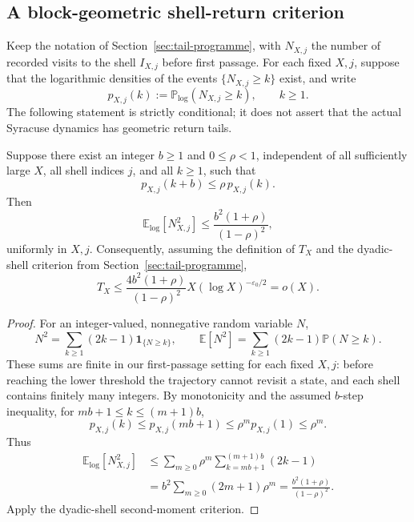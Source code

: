 \subsection*{A block-geometric shell-return criterion}

Keep the notation of Section~\ref{sec:tail-programme}, with
$N_{X,j}$ the number of recorded visits to the shell $I_{X,j}$
before first passage. For each fixed $X,j$, suppose that the
logarithmic densities of the events $\{N_{X,j}\ge k\}$ exist, and
write
\[
 p_{X,j}(k):=\mathbb P_{\log}(N_{X,j}\ge k),\qquad k\ge1.
\]
The following statement is strictly conditional; it does not assert
that the actual Syracuse dynamics has geometric return tails.

\begin{proposition}
\label{prop:block-geometric-shell-return}
Suppose there exist an integer $b\ge1$ and $0\le\rho<1$,
independent of all sufficiently large $X$, all shell indices $j$,
and all $k\ge1$, such that
\begin{equation}\label{eq:block-geometric-shell-assumption}
 p_{X,j}(k+b)\le\rho\,p_{X,j}(k).
\end{equation}
Then
\[
 \mathbb E_{\log}[N_{X,j}^{2}]
 \le \frac{b^{2}(1+\rho)}{(1-\rho)^{2}},
\]
uniformly in $X,j$. Consequently, assuming the definition of $T_X$
and the dyadic-shell criterion from Section~\ref{sec:tail-programme},
\[
 T_X \le
 \frac{4b^{2}(1+\rho)}{(1-\rho)^{2}}
 X(\log X)^{-\varepsilon_0/2}
 =o(X).
\]
\end{proposition}
\begin{proof}
For an integer-valued, nonnegative random variable $N$,
\[
 N^{2}=\sum_{k\ge1}(2k-1)\mathbf 1_{\{N\ge k\}},
\qquad
\mathbb E[N^{2}]=\sum_{k\ge1}(2k-1)\mathbb P(N\ge k).
\]
These sums are finite in our first-passage setting for each fixed
$X,j$: before reaching the lower threshold the trajectory cannot
revisit a state, and each shell contains finitely many integers.
By monotonicity and the assumed $b$-step inequality, for
$mb+1\le k\le(m+1)b$,
\[
 p_{X,j}(k)\le p_{X,j}(mb+1)
 \le \rho^{m}p_{X,j}(1)\le\rho^{m}.
\]
Thus
\[
 \begin{aligned}
 \mathbb E_{\log}[N_{X,j}^{2}]
 &\le \sum_{m\ge0}\rho^{m}
    \sum_{k=mb+1}^{(m+1)b}(2k-1)\\
 &= b^{2}\sum_{m\ge0}(2m+1)\rho^{m}
 =\frac{b^{2}(1+\rho)}{(1-\rho)^{2}}.
 \end{aligned}
\]
Apply the dyadic-shell second-moment criterion.
\end{proof}

